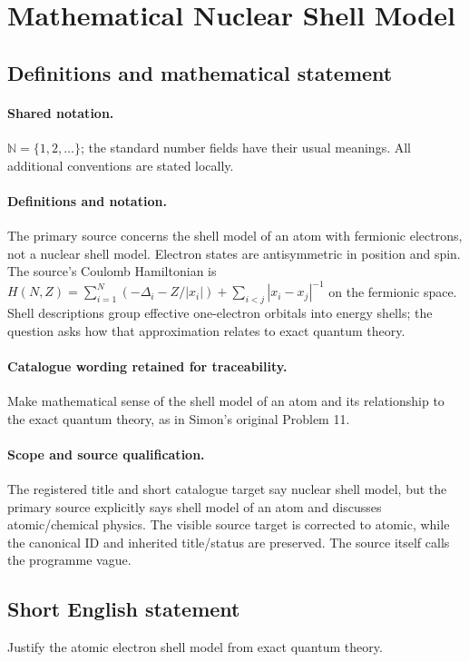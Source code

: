 \documentclass[11pt]{article}
\begin{document}
\section{Mathematical Nuclear Shell Model}\label{statement}

\subsection{Definitions and mathematical statement}

\paragraph{Shared notation.}$\mathbb N=\{1,2,\ldots\}$; the standard number fields have their usual meanings. All additional conventions are stated locally.


\paragraph{Definitions and notation.}The primary source concerns the shell model of an atom with fermionic electrons, not a nuclear shell model. Electron states are antisymmetric in position and spin. The source's Coulomb Hamiltonian is $H(N,Z)=\sum_{i=1}^N(-\Delta_i-Z/|x_i|)+\sum_{i<j}|x_i-x_j|^{-1}$ on the fermionic space. Shell descriptions group effective one-electron orbitals into energy shells; the question asks how that approximation relates to exact quantum theory.

\paragraph{Catalogue wording retained for traceability.}
Make mathematical sense of the shell model of an atom and its relationship to the exact quantum theory, as in Simon’s original Problem 11.
\paragraph{Scope and source qualification.}The registered title and short catalogue target say nuclear shell model, but the primary source explicitly says shell model of an atom and discusses atomic/chemical physics. The visible source target is corrected to atomic, while the canonical ID and inherited title/status are preserved. The source itself calls the programme vague.
\subsection{Short English statement}
Justify the atomic electron shell model from exact quantum theory.
\end{document}
